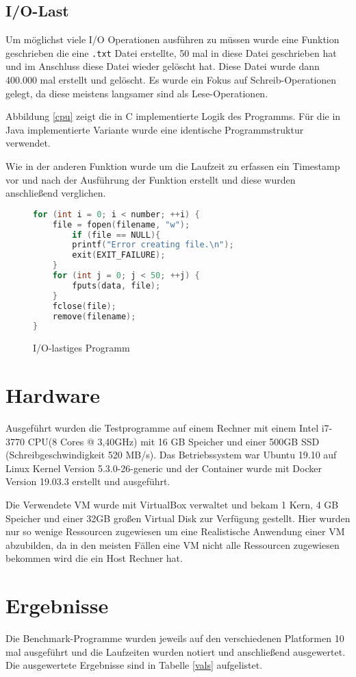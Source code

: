 \documentclass[10pt,a4paper]{article}
\begin{document}
	\subsection{I/O-Last}
	Um möglichst viele I/O Operationen ausführen zu müssen wurde eine Funktion geschrieben die eine \texttt{.txt} Datei erstellte, 50 mal in diese Datei geschrieben hat und im Anschluss diese Datei wieder gelöscht hat. Diese Datei wurde dann 400.000 mal erstellt und gelöscht. Es wurde ein Fokus auf Schreib-Operationen gelegt, da diese meistens langsamer sind als Lese-Operationen.
	
	Abbildung \ref{cpu} zeigt die in C implementierte Logik des Programms. Für die in Java implementierte Variante wurde eine identische Programmstruktur verwendet.
	
	Wie in der anderen Funktion wurde um die Laufzeit zu erfassen ein Timestamp vor und nach der Ausführung der Funktion erstellt und diese wurden anschließend verglichen.
	
\begin{figure}[h]
	\begin{lstlisting}[language=C, tabsize=3]
for (int i = 0; i < number; ++i) {
	file = fopen(filename, "w");
		if (file == NULL){
		printf("Error creating file.\n");
		exit(EXIT_FAILURE);
	}
	for (int j = 0; j < 50; ++j) {
		fputs(data, file);
	}
	fclose(file);
	remove(filename);
}
	\end{lstlisting}
	\caption{I/O-lastiges Programm}
	\label{io}
\end{figure}
	
	\section{Hardware}
	
	Ausgeführt wurden die Testprogramme auf einem Rechner mit einem Intel i7-3770 CPU(8 Cores @ 3,40GHz) mit 16 GB Speicher und einer 500GB SSD (Schreibgeschwindigkeit 520 MB/s). Das Betriebssystem war Ubuntu 19.10 auf Linux Kernel Version 5.3.0-26-generic und der Container wurde mit Docker Version 19.03.3 erstellt und ausgeführt.
	
	Die Verwendete VM wurde mit VirtualBox verwaltet und bekam 1 Kern, 4 GB Speicher und einer 32GB großen Virtual Disk zur Verfügung gestellt. Hier wurden nur so wenige Ressourcen zugewiesen um eine Realistische Anwendung einer VM abzubilden, da in den meisten Fällen eine VM nicht alle Ressourcen zugewiesen bekommen wird die ein Host Rechner hat.
	
	\section{Ergebnisse}
	Die Benchmark-Programme wurden jeweils auf den verschiedenen Platformen 10 mal ausgeführt und die Laufzeiten wurden notiert und anschließend ausgewertet. Die ausgewertete Ergebnisse sind in Tabelle \ref{vals} aufgelistet.
	
\end{document}
